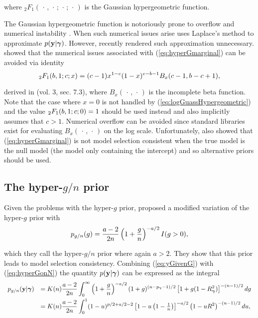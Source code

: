 \noindent where ${}_2F_1(\,\cdot\,,\,\cdot\,;\,\cdot\,;\,\cdot\,)$ is the Gaussian hypergeometric function.

The Gaussian hypergeometric function is notoriously prone 
to overflow and numerical instability \citep{Pearson2017}. When such numerical issues arise 
\cite{Liang2008} uses Laplace's method to approximate $p({\bf y}|{\boldsymbol \gamma})$. 
However, recently \cite{Nadarajah2015}
rendered such approximation unnecessary.
\cite{Nadarajah2015} showed that the numerical issues associated with (\ref{eq:hyperGmarginal}) can be avoided 
via identity 
\begin{equation}\label{eq:logGuassHypergeometric}
\displaystyle {}_2F_1(b,1;c;x) = (c-1) x^{1-c} (1-x)^{c-b-1} B_x (c-1, b-c+1),
\end{equation}

\noindent derived in \cite{PrudnikovEtal1986} (vol. 3, sec. 7.3), where 
$B_x(\,\cdot\,,\,\cdot\,)$
is the incomplete beta function. Note that the case where $x=0$ is not handled by 
(\ref{eq:logGuassHypergeometric}) and the value $\displaystyle {}_2F_1(b,1;c;0) = 1$ should be used instead
and also implicitly assumes that $c>1$. Numerical overflow can be avoided
since standard libraries exist for evaluating $B_x(\,\cdot\,,\,\cdot\,)$
on the log scale.
Unfortunately, \cite{Liang2008} also showed that
(\ref{eq:hyperGmarginal}) is not model selection consistent when the
true model is the null model (the model only containing the intercept) and so alternative priors should be used.




\subsection{The hyper-$g/n$ prior}

Given the problems with the hyper-$g$ prior, \cite{Liang2008} 
proposed a modified variation of the hyper-$g$ prior with
\begin{equation}\label{eq:hyperGonN}
\displaystyle p_{g/n}(g) = \frac{a - 2}{2n}\left( 1 + \frac{g}{n} \right)^{-a/2}I(g>0),
\end{equation}

\noindent which they call the hyper-$g/n$ prior where again $a>2$.
They show that this prior leads to model selection consistency.
Combining (\ref{eq:yGivenG}) with (\ref{eq:hyperGonN}) the quantity $p({\bf y}|{\boldsymbol \gamma})$ 
can be expressed as the integral
\begin{equation}\label{eq:hyperGonNmarginalIntegral}
\begin{array}{rl}
p_{g/n}({\bf y}|{\boldsymbol \gamma}) 
& \displaystyle 
= K(n) \frac{a - 2}{2n}  \int_0^\infty 
\left( 1 + \frac{g}{n} \right)^{-a/2}
(1 + g)^{(n-p_{\boldsymbol \gamma}-1)/2} \left[ 1 + g (1 - R_{\boldsymbol \gamma}^2) \right]^{-(n-1)/2}  dg
\\ [2ex]
& \displaystyle = K(n) \frac{a - 2}{2n}  \int_0^1 
(1 - u)^{p/2 + a/2 - 2  } \left[ 1 - u \left(1  -  \tfrac{1}{n} \right) \right]^{-a/2} \left(  1 - u R^2\right)^{-(n-1)/2} du,
\end{array} 
\end{equation}

